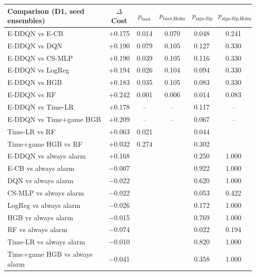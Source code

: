 \begin{tabular}{lccccc}
\toprule
Comparison (D1, seed ensembles) & $\Delta$Cost & $p_{\text{boot}}$ & $p_{\text{boot,Holm}}$ & $p_{\text{sign-flip}}$ & $p_{\text{sign-flip,Holm}}$ \\
\midrule
E-DDQN vs E-CB & +0.175 & 0.014 & 0.070 & 0.048 & 0.241 \\
E-DDQN vs DQN & +0.190 & 0.079 & 0.105 & 0.127 & 0.330 \\
E-DDQN vs CS-MLP & +0.190 & 0.039 & 0.105 & 0.116 & 0.330 \\
E-DDQN vs LogReg & +0.194 & 0.026 & 0.104 & 0.094 & 0.330 \\
E-DDQN vs HGB & +0.183 & 0.035 & 0.105 & 0.083 & 0.330 \\
E-DDQN vs RF & +0.242 & 0.001 & 0.006 & 0.014 & 0.083 \\
E-DDQN vs Time-LR & +0.178 & -- & -- & 0.117 & -- \\
E-DDQN vs Time+game HGB & +0.209 & -- & -- & 0.067 & -- \\
Time-LR vs RF & +0.063 & 0.021 &  & 0.044 &  \\
Time+game HGB vs RF & +0.032 & 0.274 &  & 0.302 &  \\
E-DDQN vs always alarm & +0.168 &  &  & 0.250 & 1.000 \\
E-CB vs always alarm & $-$0.007 &  &  & 0.922 & 1.000 \\
DQN vs always alarm & $-$0.022 &  &  & 0.620 & 1.000 \\
CS-MLP vs always alarm & $-$0.022 &  &  & 0.053 & 0.422 \\
LogReg vs always alarm & $-$0.026 &  &  & 0.172 & 1.000 \\
HGB vs always alarm & $-$0.015 &  &  & 0.769 & 1.000 \\
RF vs always alarm & $-$0.074 &  &  & 0.022 & 0.194 \\
Time-LR vs always alarm & $-$0.010 &  &  & 0.820 & 1.000 \\
Time+game HGB vs always alarm & $-$0.041 &  &  & 0.358 & 1.000 \\
\bottomrule
\end{tabular}
